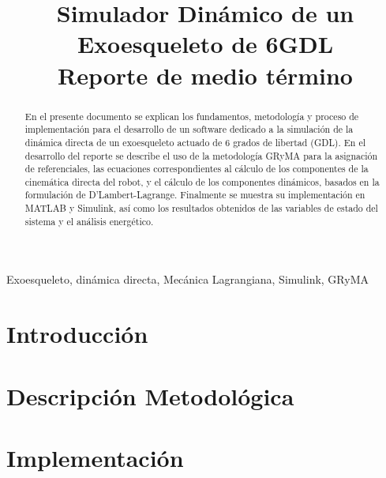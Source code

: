\documentclass[journal]{IEEEtran}
\begin{document}
    \title{Simulador Dinámico de un Exoesqueleto de 6GDL\\
    \small{Reporte de medio término}}

    \author{
    }

    \maketitle

    \begin{abstract}
        En el presente documento se explican los fundamentos, metodología y proceso de implementación 
        para el desarrollo de un software dedicado a la simulación de la dinámica directa de un 
        exoesqueleto actuado de 6 grados de libertad (GDL). En el desarrollo del reporte se describe 
        el uso de la metodología GRyMA para la asignación de referenciales, las ecuaciones correspondientes 
        al cálculo de los componentes de la cinemática directa del robot, y el cálculo de los componentes 
        dinámicos, basados en la formulación de D'Lambert-Lagrange. Finalmente se muestra su implementación en 
        MATLAB y Simulink, así como los resultados obtenidos de las variables de estado del sistema y el análisis 
        energético.
    \end{abstract}

    \begin{IEEEkeywords}
    Exoesqueleto, dinámica directa, Mecánica Lagrangiana, Simulink, GRyMA
    \end{IEEEkeywords}

    \section{Introducción}
    

    \section{Descripción Metodológica}

    
    


    \section{Implementación}
\end{document}
